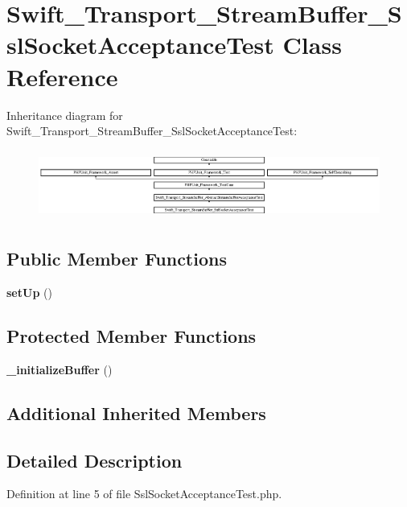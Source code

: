 \section{Swift\+\_\+\+Transport\+\_\+\+Stream\+Buffer\+\_\+\+Ssl\+Socket\+Acceptance\+Test Class Reference}
\label{class_swift___transport___stream_buffer___ssl_socket_acceptance_test}
Inheritance diagram for Swift\+\_\+\+Transport\+\_\+\+Stream\+Buffer\+\_\+\+Ssl\+Socket\+Acceptance\+Test\+:\begin{figure}[H]
\begin{center}
\leavevmode
\includegraphics[height=2.287582cm]{class_swift___transport___stream_buffer___ssl_socket_acceptance_test}
\end{center}
\end{figure}
\subsection*{Public Member Functions}
\begin{DoxyCompactItemize}
\item 
{\bf set\+Up} ()
\end{DoxyCompactItemize}
\subsection*{Protected Member Functions}
\begin{DoxyCompactItemize}
\item 
{\bf \+\_\+initialize\+Buffer} ()
\end{DoxyCompactItemize}
\subsection*{Additional Inherited Members}


\subsection{Detailed Description}


Definition at line 5 of file Ssl\+Socket\+Acceptance\+Test.\+php.



